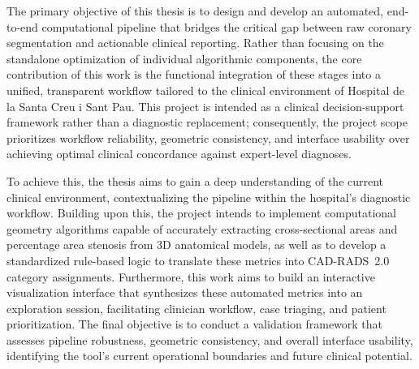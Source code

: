 The primary objective of this thesis is to design and develop an automated, end-to-end computational pipeline that bridges the critical gap between raw coronary segmentation and actionable clinical reporting. Rather than focusing on the standalone optimization of individual algorithmic components, the core contribution of this work is the functional integration of these stages into a unified, transparent workflow tailored to the clinical environment of Hospital de la Santa Creu i Sant Pau. This project is intended as a clinical decision-support framework rather than a diagnostic replacement; consequently, the project scope prioritizes workflow reliability, geometric consistency, and interface usability over achieving optimal clinical concordance against expert-level diagnoses.

To achieve this, the thesis aims to gain a deep understanding of the current clinical environment, contextualizing the pipeline within the hospital's diagnostic workflow. Building upon this, the project intends to implement computational geometry algorithms capable of accurately extracting cross-sectional areas and percentage area stenosis from 3D anatomical models, as well as to develop a standardized rule-based logic to translate these metrics into CAD-RADS~2.0 category assignments. Furthermore, this work aims to build an interactive visualization interface that synthesizes these automated metrics into an exploration session, facilitating clinician workflow, case triaging, and patient prioritization. The final objective is to conduct a validation framework that assesses pipeline robustness, geometric consistency, and overall interface usability, identifying the tool's current operational boundaries and future clinical potential.

\setlength{\parskip}{0pt plus 1pt}
\setlength{\parindent}{15pt}
